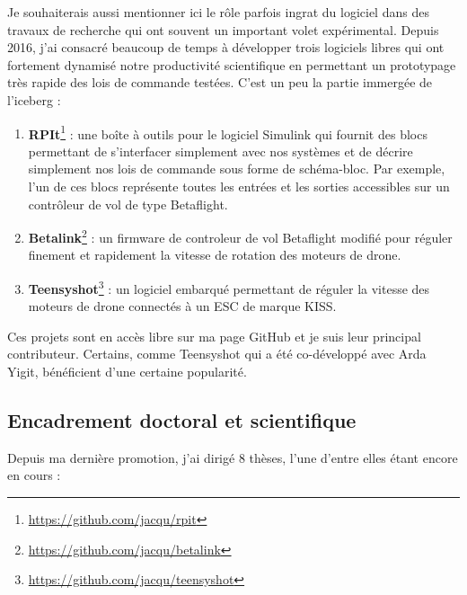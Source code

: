 \documentclass[a4paper,12pt]{article}
\begin{document}
Je souhaiterais aussi mentionner ici le rôle parfois ingrat du logiciel dans des travaux de recherche qui ont souvent un important volet expérimental. Depuis 2016, j'ai consacré beaucoup de temps à développer trois logiciels libres qui ont fortement dynamisé notre productivité scientifique en permettant un prototypage très rapide des lois de commande testées. C'est un peu la partie immergée de l'iceberg :
\begin{enumerate}
    \item \textbf{RPIt}\footnote{\url{https://github.com/jacqu/rpit}} : une boîte à outils pour le logiciel Simulink qui fournit des blocs permettant de s'interfacer simplement avec nos systèmes et de décrire simplement nos lois de commande sous forme de schéma-bloc. Par exemple, l'un de ces blocs représente toutes les entrées et les sorties accessibles sur un contrôleur de vol de type Betaflight.
    \item \textbf{Betalink}\footnote{\url{https://github.com/jacqu/betalink}} : un firmware de controleur de vol Betaflight modifié pour réguler finement et rapidement la vitesse de rotation des moteurs de drone.
    \item \textbf{Teensyshot}\footnote{\url{https://github.com/jacqu/teensyshot}} : un logiciel embarqué permettant de réguler la vitesse des moteurs de drone connectés à un ESC de marque KISS.
\end{enumerate}

Ces projets sont en accès libre sur ma page GitHub et je suis leur principal contributeur. Certains, comme Teensyshot qui a été co-développé avec Arda Yigit, bénéficient d'une certaine popularité. 

\subsection{Encadrement doctoral et scientifique}

Depuis ma dernière promotion, j'ai dirigé 8 thèses, l'une d'entre elles étant encore en cours :
\end{document}
